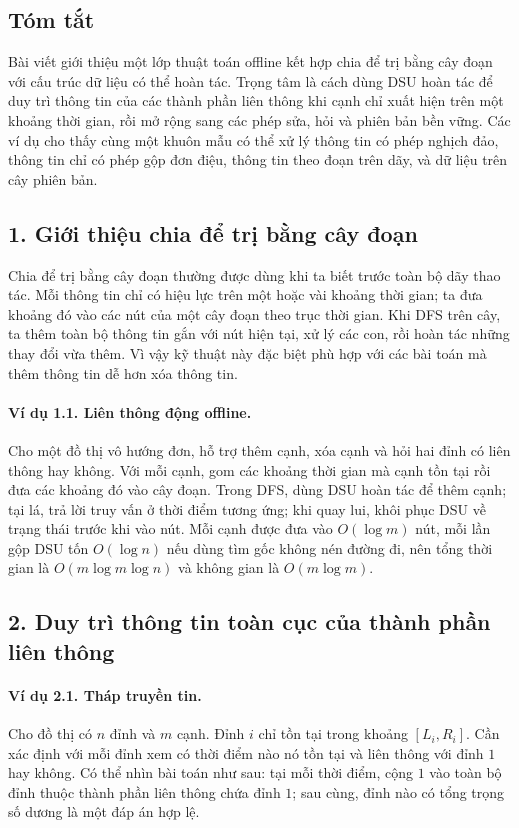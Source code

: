 \documentclass[11pt]{article}
\begin{document}
\subsection*{Tóm tắt}

Bài viết giới thiệu một lớp thuật toán offline kết hợp chia để trị bằng cây
đoạn với cấu trúc dữ liệu có thể hoàn tác. Trọng tâm là cách dùng DSU hoàn tác
để duy trì thông tin của các thành phần liên thông khi cạnh chỉ xuất hiện trên
một khoảng thời gian, rồi mở rộng sang các phép sửa, hỏi và phiên bản bền vững.
Các ví dụ cho thấy cùng một khuôn mẫu có thể xử lý thông tin có phép nghịch
đảo, thông tin chỉ có phép gộp đơn điệu, thông tin theo đoạn trên dãy, và dữ
liệu trên cây phiên bản.

\subsection*{1. Giới thiệu chia để trị bằng cây đoạn}

Chia để trị bằng cây đoạn thường được dùng khi ta biết trước toàn bộ dãy thao
tác. Mỗi thông tin chỉ có hiệu lực trên một hoặc vài khoảng thời gian; ta đưa
khoảng đó vào các nút của một cây đoạn theo trục thời gian. Khi DFS trên cây,
ta thêm toàn bộ thông tin gắn với nút hiện tại, xử lý các con, rồi hoàn tác
những thay đổi vừa thêm. Vì vậy kỹ thuật này đặc biệt phù hợp với các bài toán
mà thêm thông tin dễ hơn xóa thông tin.

\paragraph{Ví dụ 1.1. Liên thông động offline.}
Cho một đồ thị vô hướng đơn, hỗ trợ thêm cạnh, xóa cạnh và hỏi hai đỉnh có liên
thông hay không. Với mỗi cạnh, gom các khoảng thời gian mà cạnh tồn tại rồi
đưa các khoảng đó vào cây đoạn. Trong DFS, dùng DSU hoàn tác để thêm cạnh; tại
lá, trả lời truy vấn ở thời điểm tương ứng; khi quay lui, khôi phục DSU về
trạng thái trước khi vào nút. Mỗi cạnh được đưa vào \(O(\log m)\) nút, mỗi lần
gộp DSU tốn \(O(\log n)\) nếu dùng tìm gốc không nén đường đi, nên tổng thời
gian là \(O(m\log m\log n)\) và không gian là \(O(m\log m)\).

\subsection*{2. Duy trì thông tin toàn cục của thành phần liên thông}

\paragraph{Ví dụ 2.1. Tháp truyền tin.}
Cho đồ thị có \(n\) đỉnh và \(m\) cạnh. Đỉnh \(i\) chỉ tồn tại trong khoảng
\([L_i,R_i]\). Cần xác định với mỗi đỉnh xem có thời điểm nào nó tồn tại và
liên thông với đỉnh \(1\) hay không. Có thể nhìn bài toán như sau: tại mỗi thời
điểm, cộng \(1\) vào toàn bộ đỉnh thuộc thành phần liên thông chứa đỉnh \(1\);
sau cùng, đỉnh nào có tổng trọng số dương là một đáp án hợp lệ.
\end{document}
